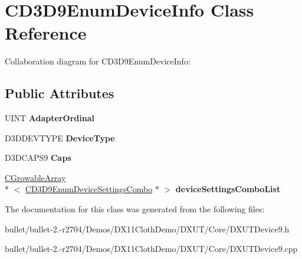 \hypertarget{class_c_d3_d9_enum_device_info}{\section{C\+D3\+D9\+Enum\+Device\+Info Class Reference}
\label{class_c_d3_d9_enum_device_info}
}


Collaboration diagram for C\+D3\+D9\+Enum\+Device\+Info\+:
\subsection*{Public Attributes}
\begin{DoxyCompactItemize}
\item 
\hypertarget{class_c_d3_d9_enum_device_info_aacaf172c9e429753c9f71dbab0c7f70f}{U\+I\+N\+T {\bfseries Adapter\+Ordinal}}\label{class_c_d3_d9_enum_device_info_aacaf172c9e429753c9f71dbab0c7f70f}

\item 
\hypertarget{class_c_d3_d9_enum_device_info_a77a3829850aaad7b73011faf6e6f7299}{D3\+D\+D\+E\+V\+T\+Y\+P\+E {\bfseries Device\+Type}}\label{class_c_d3_d9_enum_device_info_a77a3829850aaad7b73011faf6e6f7299}

\item 
\hypertarget{class_c_d3_d9_enum_device_info_ae0af2d49ef7f39af6c2b372f095e3336}{D3\+D\+C\+A\+P\+S9 {\bfseries Caps}}\label{class_c_d3_d9_enum_device_info_ae0af2d49ef7f39af6c2b372f095e3336}

\item 
\hypertarget{class_c_d3_d9_enum_device_info_a8d2b3be950cc2d8787ba26de6233b1a7}{\hyperlink{class_c_growable_array}{C\+Growable\+Array}\\*
$<$ \hyperlink{struct_c_d3_d9_enum_device_settings_combo}{C\+D3\+D9\+Enum\+Device\+Settings\+Combo} $\ast$ $>$ {\bfseries device\+Settings\+Combo\+List}}\label{class_c_d3_d9_enum_device_info_a8d2b3be950cc2d8787ba26de6233b1a7}

\end{DoxyCompactItemize}


The documentation for this class was generated from the following files\+:\begin{DoxyCompactItemize}
\item 
bullet/bullet-\/2.-\/r2704/\+Demos/\+D\+X11\+Cloth\+Demo/\+D\+X\+U\+T/\+Core/D\+X\+U\+T\+Device9.\+h\item 
bullet/bullet-\/2.-\/r2704/\+Demos/\+D\+X11\+Cloth\+Demo/\+D\+X\+U\+T/\+Core/D\+X\+U\+T\+Device9.\+cpp\end{DoxyCompactItemize}
